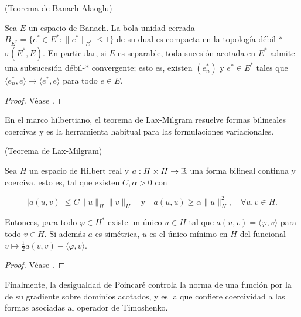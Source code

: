 \begin{Teorema}{(Teorema de Banach-Alaoglu)}
\label{ch:preliminares:th:banachAlaoglu}

Sea $E$ un espacio de Banach. La bola unidad cerrada
$B_{E^*} = \{e^* \in E^* : \lVert e^* \rVert_{E^*} \leq 1\}$ de su dual es compacta
en la topología débil-$*$ $\sigma(E^*, E)$. En particular, si $E$ es separable,
toda sucesión acotada en $E^*$ admite una subsucesión débil-$*$ convergente; esto
es, existen $(e_n^*)$ y $e^* \in E^*$ tales que
$\langle e_n^*, e \rangle \rightarrow \langle e^*, e \rangle$ para todo $e \in E$.
\end{Teorema}

\begin{proof}
Véase \cite[Teorema~3.16]{brezis-2011-fun-ana-sob}.
\end{proof}

En el marco hilbertiano, el teorema de Lax-Milgram resuelve formas bilineales
coercivas y es la herramienta habitual para las formulaciones variacionales.\\

\begin{Teorema}{(Teorema de Lax-Milgram)}
\label{ch:preliminares:th:laxMilgram}

Sea $H$ un espacio de Hilbert real y $a : H \times H \rightarrow \mathbb{R}$ una forma
bilineal continua y coerciva, esto es, tal que existen $C, \alpha > 0$ con

\[|a(u, v)| \leq C \lVert u \rVert_H \lVert v \rVert_H \quad \text{y} \quad a(u, u) \geq \alpha \lVert u \rVert_H^2, \quad \forall u, v \in H.\]

Entonces, para todo $\varphi \in H^*$ existe un único $u \in H$ tal que
$a(u, v) = \langle \varphi, v \rangle$ para todo $v \in H$. Si además $a$ es
simétrica, $u$ es el único mínimo en $H$ del funcional
$v \mapsto \tfrac{1}{2}a(v, v) - \langle \varphi, v \rangle$.
\end{Teorema}

\begin{proof}
Véase \cite[Corolario~5.8]{brezis-2011-fun-ana-sob}.
\end{proof}

Finalmente, la desigualdad de Poincaré controla la norma de una función por la de
su gradiente sobre dominios acotados, y es la que confiere coercividad a las
formas asociadas al operador de Timoshenko.\\

